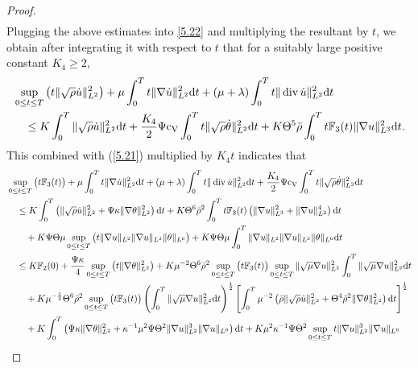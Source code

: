 \documentclass[11pt]{article}
\DeclareMathOperator{\divv}{div}
\newcommand{\na}{\nabla}
\begin{document}
\begin{proof}
\begin{align*}
\end{align*}
Plugging the above estimates into \eqref{5.22} and multiplying the resultant by $t$, we obtain after integrating it with respect to $t$ that for a suitably large positive constant $K_4 \geq 2$,
\begin{align*}
& \sup_{0 \leq t \leq T}\big(t \|\sqrt{\rho} \dot{u}\|_{L^2}^2\big)+ \mu \int^T_0 t \|\na \dot{u}\|_{L^2}^2 {\rm d} t + \left( \mu + \lambda \right) \int^T_0 t \|\divv \dot{u}\|_{L^2}^2 {\rm d} t\\
& \quad \leq K \int^T_0 \|\sqrt{\rho} \dot{u}\|_{L^2}^2 {\rm d} t + \frac{K_4}{2} \Psi {\rm c_V} \int^T_0 t \|\sqrt{\rho} \dot{\theta}\|_{L^2}^2 {\rm d} t + K \Theta^5 \bar{\rho} \int^T_0 t \mathbb{F}_3 (t) \|\na u\|_{L^3}^2 {\rm d} t.
\end{align*}
This combined with (\ref{5.21}) multiplied by $K_4 t$ indicates that
\begin{align*}
& \sup_{0 \leq t \leq T}\big(t \mathbb{F}_3(t)\big)+ \mu \int^T_0 t \|\na \dot{u}\|_{L^2}^2 {\rm d} t + \left( \mu + \lambda \right) \int^T_0 t \|\divv \dot{u}\|_{L^2}^2 {\rm d} t + \frac{K_4}{2} \Psi {\rm c_V} \int^T_0 t \|\sqrt{\rho} \dot{\theta}\|_{L^2}^2 {\rm d} t \\
& \quad \leq K \int^T_0 \left(\|\sqrt{\rho} \dot{u}\|_{L^2}^2 + \Psi \kappa \|\na \theta\|_{L^2}^2 \right) {\rm d} t + K \Theta^6 \bar{\rho}^2 \int^T_0 t \mathbb{F}_3 (t) \left(\|\na u\|_{L^3}^2 + \|\na u\|_{L^2}^4 \right) {\rm d} t\\
& \qquad + K \Psi \Theta \mu \sup_{0 \leq t \leq T}\big(t \|\na u\|_{L^2} \|\na u\|_{L^3} \|\theta\|_{L^6}\big)+ K \Psi \Theta \mu \int^T_0 \|\na u\|_{L^2} \|\na u\|_{L^3} \|\theta\|_{L^6} {\rm d} t\\
& \quad \leq K \mathbb{F}_2 (0) + \frac{\Psi \kappa}{4} \sup_{0 \leq t \leq T} \big(t\|\na \theta\|_{L^2}^2\big)+ K \mu^{-2} \Theta^6 \bar{\rho}^2 \sup_{0 \leq t \leq T}\big(t \mathbb{F}_3 (t)\big)\sup_{0 \leq t \leq T} \|\sqrt{\mu}\na u\|_{L^2}^2 \int^T_0 \|\sqrt{\mu}\na u\|_{L^2}^2 {\rm d} t\\
& \qquad + K \mu^{-\frac{1}{2}} \Theta^6 \bar{\rho}^2 \sup_{0 \leq t \leq T}\big(t \mathbb{F}_3 (t)\big)\left(\int^T_0 \|\sqrt{\mu}\na u\|_{L^2}^2 {\rm d} t \right)^{\frac{1}{2}} \left[\int^T_0 \mu^{-2} \left(\bar{\rho} \|\sqrt{\rho} \dot{u}\|_{L^2}^2 + \Theta^4 \bar{\rho}^2 \|\na \theta\|_{L^2}^2 \right){\rm d} t \right]^{\frac{1}{2}}\\
& \qquad + K \int^T_0 \left( \Psi \kappa \|\na \theta\|_{L^2}^2 + \kappa^{-1} \mu^2 \Psi \Theta^2 \|\na u\|_{L^2}^3 \|\na u\|_{L^6} \right) {\rm d} t + K \mu^2 \kappa^{-1} \Psi \Theta^2 \sup_{0 \leq t \leq T} t \|\na u\|_{L^2}^3 \|\na u\|_{L^6}\\

\end{align*}
\end{proof}
\end{document}
